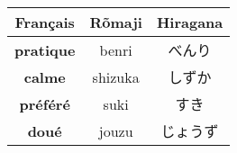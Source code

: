 \documentclass[11pt]{report}
\newenvironment{Japanese}{%
\CJKfamily{min}%
\CJKtilde  
\CJKnospace}{}
\begin{document}
\begin{CJK}{UTF8}{}  
\begin{Japanese}
	\begin{center}
		\begin{multicols}{2}
			\begin{tabular}{|c|c|c|}
				\hline
				\textbf{Français} & \textbf{Rõmaji} & \textbf{Hiragana} \\
				\hline
				\textbf{pratique} & benri & べんり \\%
				\hline
				\textbf{calme} & shizuka & しずか \\%
				\hline
				\textbf{préféré} & suki & すき \\%
				\hline
				\textbf{doué} & jouzu & じょうず \\%
				\hline


\end{tabular}
\end{multicols}
\end{center}
\end{Japanese}
\end{CJK}
\end{document}
